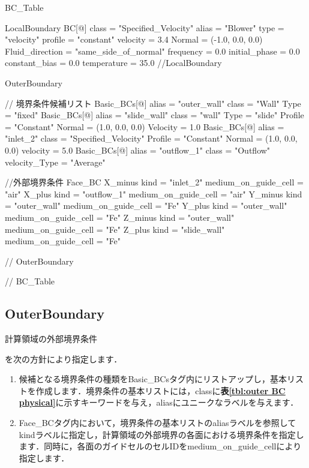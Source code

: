 {\small
\begin{program}
BC_Table {

  LocalBoundary {
    BC[@] {
      class           = "Specified_Velocity"
      alias           = "Blower"
      type            = "velocity"
      profile         = "constant"
      velocity        = 3.4
      Normal          = (-1.0, 0.0, 0.0)
      Fluid_direction = "same_side_of_normal"
      frequency       = 0.0
      initial_phase   = 0.0
      constant_bias   = 0.0
      temperature     = 35.0
    }
  } //LocalBoundary

  OuterBoundary {
      
    // 境界条件候補リスト
    Basic_BCs[@] {
      alias    = "outer_wall"
      class    = "Wall"
      Type     = "fixed"
    }
    Basic_BCs[@] {
      alias    = "slide_wall"
      class    = "wall"
      Type     = "slide"
      Profile  = "Constant"
      Normal   = (1.0, 0.0, 0.0)
      Velocity = 1.0
    }
    Basic_BCs[@] {
      alias    = "inlet_2"
      class    = "Specified_Velocity"
      Profile  = "Constant"
      Normal   = (1.0, 0.0, 0.0)
      velocity = 5.0
    }
    Basic_BCs[@] {
      alias    = "outflow_1"
      class    = "Outflow"
      velocity_Type = "Average"
    }
      
    //外部境界条件
    Face_BC {
      X_minus {
        kind   = "inlet_2"
        medium_on_guide_cell = "air"
      }
      X_plus {
        kind   = "outflow_1"
        medium_on_guide_cell = "air"
      }
      Y_minus {
        kind   = "outer_wall"
        medium_on_guide_cell = "Fe"
      }
      Y_plus {
        kind   = "outer_wall"
        medium_on_guide_cell = "Fe"
      }
      Z_minus {
        kind   = "outer_wall"
        medium_on_guide_cell = "Fe"
      }
      Z_plus {
        kind   = "slide_wall"
        medium_on_guide_cell = "Fe"
      }
    }

  } // OuterBoundary

} // BC_Table
\end{program}
}


%
\subsection{OuterBoundary}

\hypertarget{tgt:outer_boundary}{計算領域の外部境界条件}を次の方針により指定します．

\begin{enumerate}
\item 候補となる境界条件の種類をBasic\_BCsタグ内にリストアップし，基本リストを作成します．境界条件の基本リストには，classに\textbf{表\ref{tbl:outer BC physical}}に示すキーワードを与え，aliasにユニークなラベルを与えます．
\item Face\_BCタグ内において，境界条件の基本リストのaliasラベルを参照してkindラベルに指定し，計算領域の外部境界の各面における境界条件を指定します．同時に，各面のガイドセルのセルIDをmedium\_on\_guide\_cellにより指定します．
\end{enumerate}


